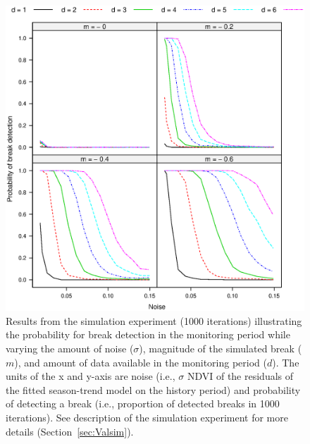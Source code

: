 \documentclass[authoryear,preprint,review,10pt]{elsarticle}
\begin{document}
\begin{figure}[htp]
\centering
    \includegraphics[height=0.9\textwidth]{figs/Fig4_NrDetections_Time_1000.eps}
  \caption{Results from the simulation experiment (1000 iterations) illustrating the probability for break detection in the monitoring period while varying the amount of noise ($\sigma$), magnitude of the simulated break ($m$), and amount of data  available in the monitoring period ($d$). The units of the x and y-axis are noise (i.e., $\sigma$ NDVI of the residuals of the fitted season-trend model on the history period) and probability of detecting a break (i.e., proportion of detected breaks in 1000 iterations). See description of the simulation experiment for more details (Section~\ref{sec:Valsim}). }
  \label{fig:SimNr}
\end{figure}
\end{document}
